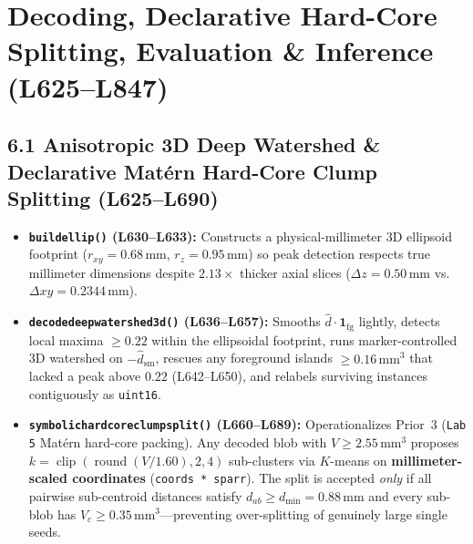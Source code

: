 \documentclass[10pt,a4paper]{article}
\renewcommand{\_}{\origunderscore\allowbreak}
\begin{document}
\section[\texorpdfstring{Decoding, Declarative Hard-Core Splitting, Evaluation \& Inference (L625--L847)}{Decoding, Declarative Hard-Core Splitting, Evaluation & Inference (L625--L847)}]{Decoding, Declarative Hard-Core Splitting, Evaluation \& Inference (L625--L847)}
\subsection*{6.1 Anisotropic 3D Deep Watershed \& Declarative Mat\'ern Hard-Core Clump Splitting (L625--L690)}
\begin{annotbox}
\begin{itemize}
    \item \textbf{\texttt{build\_ellip()} (L630--L633):} Constructs a physical-millimeter 3D ellipsoid footprint ($r_{xy} = 0.68\,\text{mm}$, $r_z = 0.95\,\text{mm}$) so peak detection respects true millimeter dimensions despite $2.13\times$ thicker axial slices ($\Delta z = 0.50\,\text{mm}$ vs.\ $\Delta xy = 0.2344\,\text{mm}$).
    \item \textbf{\texttt{decode\_deep\_watershed\_3d()} (L636--L657):} Smooths $\hat{d} \cdot \mathbf{1}_{\text{fg}}$ lightly, detects local maxima $\ge 0.22$ within the ellipsoidal footprint, runs marker-controlled 3D watershed on $-\hat{d}_{\text{sm}}$, rescues any foreground islands $\ge 0.16\,\text{mm}^3$ that lacked a peak above $0.22$ (L642--L650), and relabels surviving instances contiguously as \texttt{uint16}.
    \item \textbf{\texttt{symbolic\_hardcore\_clump\_split()} (L660--L689):} Operationalizes Prior~3 (\texttt{Lab 5} Mat\'ern hard-core packing). Any decoded blob with $V \ge 2.55\,\text{mm}^3$ proposes $k = \operatorname{clip}(\operatorname{round}(V / 1.60), 2, 4)$ sub-clusters via $K$-means on \textbf{millimeter-scaled coordinates} (\texttt{coords * sp\_arr}). The split is accepted \emph{only} if all pairwise sub-centroid distances satisfy $d_{ab} \ge d_{\min} = 0.88\,\text{mm}$ and every sub-blob has $V_c \ge 0.35\,\text{mm}^3$---preventing over-splitting of genuinely large single seeds.
\end{itemize}
\end{annotbox}
\end{document}
